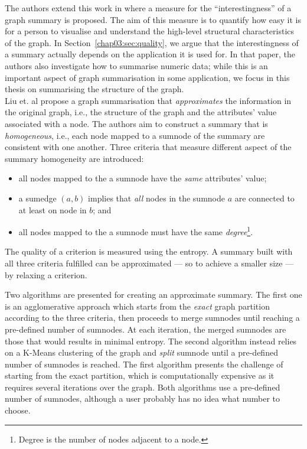 The authors extend this work in \cite{zhang:2010:ddg} where a measure for the ``interestingness'' of a graph summary is proposed. The aim of this measure is to quantify how easy it is for a person to visualise and understand the high-level structural characteristics of the graph. In Section~\ref{chap03:sec:quality}, we argue that the interestingness of a summary actually depends on the application it is used for. In that paper, the authors also investigate how to summarise numeric data; while this is an important aspect of graph summarisation in some application, we focus in this thesis on summarising the structure of the graph.\\

Liu et. al \cite{zheng:ipsj:2011} propose a graph summarisation that \emph{approximates} the information in the original graph, i.e., the structure of the graph and the attributes' value associated with a node. The authors aim to construct a summary that is \emph{homogeneous}, i.e., each node mapped to a sumnode of the summary are consistent with one another. Three criteria that measure different aspect of the summary homogeneity are introduced:
\begin{itemize}
	\item all nodes mapped to the a sumnode have the \emph{same} attributes' value;
	\item a sumedge $(a,b)$ implies that \emph{all} nodes in the sumnode $a$ are connected to at least on node in $b$; and
	\item all nodes mapped to the a sumnode must have the same \emph{degree}\footnote{Degree is the number of nodes adjacent to a node.}.
\end{itemize}
The quality of a criterion is measured using the entropy. A summary built with all three criteria fulfilled can be approximated --- so to achieve a smaller size --- by relaxing a criterion.

Two algorithms are presented for creating an approximate summary. The first one is an agglomerative approach which starts from the \emph{exact} graph partition according to the three criteria, then proceeds to merge sumnodes until reaching a pre-defined number of sumnodes. At each iteration, the merged sumnodes are those that would results in minimal entropy. The second algorithm instead relies on a K-Means clustering of the graph and \emph{split} sumnode until a pre-defined number of sumnodes is reached. The first algorithm presents the challenge of starting from the exact partition, which is computationally expensive as it requires several iterations over the graph. Both algorithms use a pre-defined number of sumnodes, although a user probably has no idea what number to choose.\\

